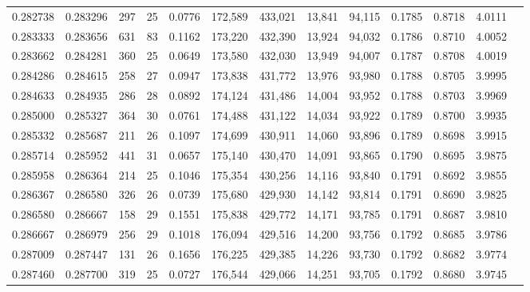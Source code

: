 \begin{tabular}{rrrrrrrrrrrrr}
0.282738 & 0.283296 &    297 &    25 &                                     0.0776 & 172,589 & 433,021 &  13,841 &  94,115 & 0.1785 & 0.8718 & 4.0111 \\
0.283333 & 0.283656 &    631 &    83 &                                     0.1162 & 173,220 & 432,390 &  13,924 &  94,032 & 0.1786 & 0.8710 & 4.0052 \\
0.283662 & 0.284281 &    360 &    25 &                                     0.0649 & 173,580 & 432,030 &  13,949 &  94,007 & 0.1787 & 0.8708 & 4.0019 \\
0.284286 & 0.284615 &    258 &    27 &                                     0.0947 & 173,838 & 431,772 &  13,976 &  93,980 & 0.1788 & 0.8705 & 3.9995 \\
0.284633 & 0.284935 &    286 &    28 &                                     0.0892 & 174,124 & 431,486 &  14,004 &  93,952 & 0.1788 & 0.8703 & 3.9969 \\
0.285000 & 0.285327 &    364 &    30 &                                     0.0761 & 174,488 & 431,122 &  14,034 &  93,922 & 0.1789 & 0.8700 & 3.9935 \\
0.285332 & 0.285687 &    211 &    26 &                                     0.1097 & 174,699 & 430,911 &  14,060 &  93,896 & 0.1789 & 0.8698 & 3.9915 \\
0.285714 & 0.285952 &    441 &    31 &                                     0.0657 & 175,140 & 430,470 &  14,091 &  93,865 & 0.1790 & 0.8695 & 3.9875 \\
0.285958 & 0.286364 &    214 &    25 &                                     0.1046 & 175,354 & 430,256 &  14,116 &  93,840 & 0.1791 & 0.8692 & 3.9855 \\
0.286367 & 0.286580 &    326 &    26 &                                     0.0739 & 175,680 & 429,930 &  14,142 &  93,814 & 0.1791 & 0.8690 & 3.9825 \\
0.286580 & 0.286667 &    158 &    29 &                                     0.1551 & 175,838 & 429,772 &  14,171 &  93,785 & 0.1791 & 0.8687 & 3.9810 \\
0.286667 & 0.286979 &    256 &    29 &                                     0.1018 & 176,094 & 429,516 &  14,200 &  93,756 & 0.1792 & 0.8685 & 3.9786 \\
0.287009 & 0.287447 &    131 &    26 &                                     0.1656 & 176,225 & 429,385 &  14,226 &  93,730 & 0.1792 & 0.8682 & 3.9774 \\
0.287460 & 0.287700 &    319 &    25 &                                     0.0727 & 176,544 & 429,066 &  14,251 &  93,705 & 0.1792 & 0.8680 & 3.9745 \\

\end{tabular}
